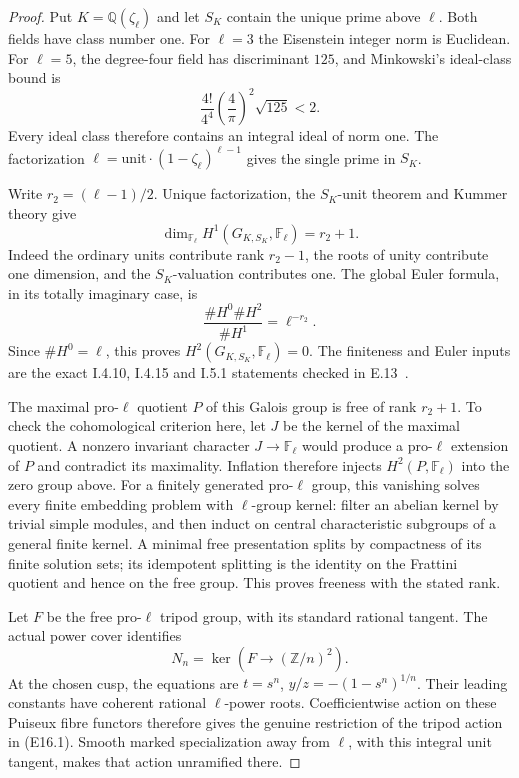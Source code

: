 \begin{proof}
Put $K=\mathbb Q(\zeta_\ell)$ and let $S_K$ contain
the unique prime above $\ell$. Both fields have
class number one. For $\ell=3$ the Eisenstein
integer norm is Euclidean. For $\ell=5$, the
degree-four field has discriminant $125$, and
Minkowski's ideal-class bound is
\[
 \frac{4!}{4^4}\left(\frac4\pi\right)^2\sqrt{125}<2.
\]
Every ideal class therefore contains an integral
ideal of norm one. The factorization
$\ell=\text{unit}\cdot(1-\zeta_\ell)^{\ell-1}$
gives the single prime in $S_K$.

Write $r_2=(\ell-1)/2$. Unique factorization,
the $S_K$-unit theorem and Kummer theory give
\[
 \dim_{\mathbb F_\ell}
 H^1(G_{K,S_K},\mathbb F_\ell)=r_2+1 .
\]
Indeed the ordinary units contribute rank $r_2-1$,
the roots of unity contribute one dimension, and
the $S_K$-valuation contributes one. The global
Euler formula, in its totally imaginary case, is
\[
 \frac{\#H^0\#H^2}{\#H^1}=\ell^{-r_2}.
\]
Since $\#H^0=\ell$, this proves
$H^2(G_{K,S_K},\mathbb F_\ell)=0$.
The finiteness and Euler inputs are the exact
I.4.10, I.4.15 and I.5.1 statements checked in
E.13~\cite{E_density_MilneADT}.

The maximal pro-$\ell$ quotient $P$ of this Galois
group is free of rank $r_2+1$. To check the
cohomological criterion here, let $J$ be the kernel
of the maximal quotient. A nonzero invariant
character $J\to\mathbb F_\ell$ would produce a
pro-$\ell$ extension of $P$ and contradict its
maximality. Inflation therefore injects
$H^2(P,\mathbb F_\ell)$ into the zero group above.
For a finitely generated pro-$\ell$ group, this
vanishing solves every finite embedding problem
with $\ell$-group kernel: filter an abelian kernel
by trivial simple modules, and then induct on
central characteristic subgroups of a general
finite kernel. A minimal free presentation splits
by compactness of its finite solution sets; its
idempotent splitting is the identity on the
Frattini quotient and hence on the free group.
This proves freeness with the stated rank.

Let $F$ be the free pro-$\ell$ tripod group, with
its standard rational tangent. The actual power
cover identifies
\[
 N_n=\ker(F\longrightarrow(\mathbb Z/n)^2).
 \tag{E16.1}
\]
At the chosen cusp, the equations are
$t=s^n$, $y/z=-(1-s^n)^{1/n}$.
Their leading constants have coherent rational
$\ell$-power roots. Coefficientwise action on
these Puiseux fibre functors therefore gives
the genuine restriction of the tripod action
in (E16.1). Smooth marked specialization away
from $\ell$, with this integral unit tangent,
makes that action unramified there.


\end{proof}
